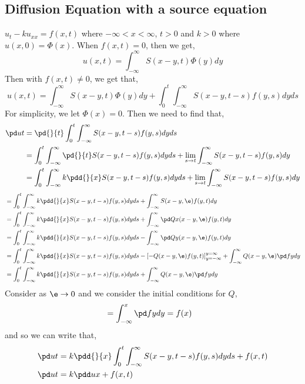 \subsection{Diffusion Equation with a source equation}
$u_t - ku_{xx} = f(x, t)$ where $-\infty < x < \infty$, $t > 0$ and $k > 0$ where $u(x, 0) = \Phi(x)$. When $f(x, t) = 0$, then we get,
$$ u(x, t) = \int_{-\infty}^\infty S(x - y, t)\Phi(y)dy $$
Then with $f(x, t) \ne 0$, we get that,
$$ u(x, t) = \int_{-\infty}^\infty S(x - y, t)\Phi(y)dy + \int_0^t \int_{-\infty}^\infty S(x - y, t - s)f(y, s)dyds$$
For simplicity, we let $\Phi(x) = 0$. Then we need to find that,
\begin{align*}
  \pd u t &= \pd{}{t}\int_0^t \int_{-\infty}^{\infty} S(x - y, t - s)f(y, s)dyds\\
  &= \int_0^t \int_{-\infty}^{\infty} \pd{}{t}S(x - y, t - s)f(y, s)dyds + \lim_{s \to t}\int_{-\infty}^\infty S(x - y, t - s)f(y, s)dy\\
  &= \int_0^t \int_{-\infty}^\infty k\pdd{}{x}S(x - y, t - s)f(y,s)dyds + \lim_{s \to t}\int_{-\infty}^\infty S(x - y, t - s)f(y, s)dy
\end{align*}
\begin{align*}
  &= \int_0^t \int_{-\infty}^\infty k\pdd{}{x}S(x - y, t - s)f(y,s)dyds + \int_{-\infty}^\infty S(x - y, \e)f(y, t)dy \\
  &= \int_0^t \int_{-\infty}^\infty k\pdd{}{x}S(x - y, t - s)f(y,s)dyds + \int_{-\infty}^\infty \pd Q x(x - y, \e)f(y, t)dy \\
  &= \int_0^t \int_{-\infty}^\infty k\pdd{}{x}S(x - y, t - s)f(y,s)dyds - \int_{-\infty}^\infty \pd Q y(x - y, \e)f(y, t)dy \\
  &= \int_0^t \int_{-\infty}^\infty k\pdd{}{x}S(x - y, t - s)f(y,s)dyds -\left[ - Q(x - y, \e)f(y, t) \right]_{y = -\infty}^{y = \infty} + \int_{-\infty}^\infty Q(x - y, \e)\pd f ydy \\
  &= \int_0^t \int_{-\infty}^\infty k\pdd{}{x}S(x - y, t - s)f(y,s)dyds + \int_{-\infty}^\infty Q(x - y, \e)\pd f y dy \\
\end{align*}
\noindent
Consider as $\e \to 0$ and we consider the initial conditions for $Q$,
\begin{align*}
  &= \int_{-\infty}^x \pd f y dy = f(x)
\end{align*}
and so we can write that,
\begin{align*}
  \pd u t &= k\pdd{}{x}\int_0^t \int_{-\infty}^\infty S(x - y, t - s)f(y, s)dyds + f(x, t) \\
  \pd u t &= k\pdd u x + f(x, t)
\end{align*}
